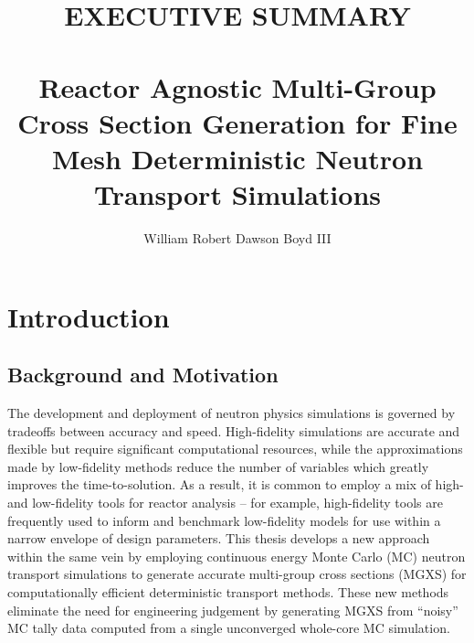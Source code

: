 \documentclass[12pt,twoside]{mitthesis-exec}
\begin{document}



\title{EXECUTIVE SUMMARY \\~\\ Reactor Agnostic Multi-Group Cross Section Generation for Fine Mesh Deterministic Neutron Transport Simulations}

\author{William Robert Dawson Boyd III}





\setcounter{savepage}{\thepage}



\singlespacing 

\section*{Introduction}

\subsection*{Background and Motivation}

The development and deployment of neutron physics simulations is governed by tradeoffs between accuracy and speed. High-fidelity simulations are accurate and flexible but require significant computational resources, while the approximations made by low-fidelity methods reduce the number of variables which greatly improves the time-to-solution. As a result, it is common to employ a mix of high- and low-fidelity tools for reactor analysis -- for example, high-fidelity tools are frequently used to inform and benchmark low-fidelity models for use within a narrow envelope of design parameters. This thesis develops a new approach within the same vein by employing continuous energy Monte Carlo (MC) neutron transport simulations to generate accurate multi-group cross sections (MGXS) for computationally efficient deterministic transport methods. These new methods eliminate the need for engineering judgement by generating MGXS from ``noisy'' MC tally data computed from a single unconverged whole-core MC simulation.
\end{document}
